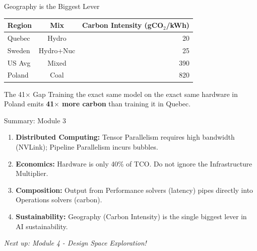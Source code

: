 \documentclass[aspectratio=169, 12pt]{beamer}
\begin{document}
\begin{frame}{Geography is the Biggest Lever}
\centering
\begin{tabular}{lcr}
\toprule
\textbf{Region} & \textbf{Mix} & \textbf{Carbon Intensity (gCO$_2$/kWh)} \\
\midrule
Quebec    & Hydro       & 20 \\
Sweden    & Hydro+Nuc   & 25 \\
US Avg    & Mixed       & 390 \\
Poland    & Coal        & 820 \\
\bottomrule
\end{tabular}
\vfill
\begin{alertblock}{The 41$\times$ Gap}
Training the exact same model on the exact same hardware in Poland emits \textbf{41$\times$ more carbon} than training it in Quebec.
\end{alertblock}
\end{frame}

\begin{frame}{Summary: Module 3}
\begin{enumerate}
  \item \textbf{Distributed Computing:} Tensor Parallelism requires high bandwidth (NVLink); Pipeline Parallelism incurs bubbles.
  \item \textbf{Economics:} Hardware is only 40\% of TCO. Do not ignore the Infrastructure Multiplier.
  \item \textbf{Composition:} Output from Performance solvers (latency) pipes directly into Operations solvers (carbon).
  \item \textbf{Sustainability:} Geography (Carbon Intensity) is the single biggest lever in AI sustainability.
\end{enumerate}
\vspace{1em}
\begin{center}
\textit{Next up: Module 4 - Design Space Exploration!}
\end{center}
\end{frame}
\end{document}
